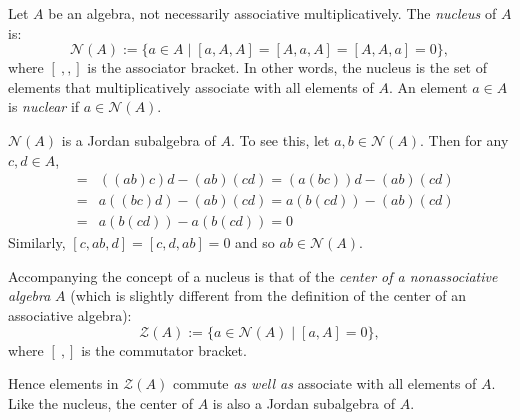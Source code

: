 \documentclass[12pt]{article}
\begin{document}

Let $A$ be an algebra, not necessarily associative multiplicatively.  The \emph{nucleus} of $A$ is:
$$\mathcal{N}(A):=\lbrace a\in A\mid [a,A,A]=[A,a,A]=[A,A,a]=0 \rbrace,$$
where $[\ , , ]$ is the associator bracket.  In other words, the nucleus is the set of elements that multiplicatively associate with all elements of $A$.  An element $a\in A$ is \emph{nuclear} if $a\in\mathcal{N}(A)$.

$\mathcal{N}(A)$ is a Jordan subalgebra of $A$.  To see this, let $a,b\in \mathcal{N}(A)$.  Then for any $c,d\in A$,  
\begin{eqnarray}
[ab,c,d] &=& ((ab)c)d-(ab)(cd) = (a(bc))d-(ab)(cd) \\
&=& a((bc)d)-(ab)(cd) = a(b(cd))-(ab)(cd) \\
&=& a(b(cd))-a(b(cd)) = 0
\end{eqnarray}
Similarly, $[c,ab,d]=[c,d,ab]=0$ and so $ab\in\mathcal{N}(A)$.

Accompanying the concept of a nucleus is that of the \emph{center of a nonassociative algebra} $A$ (which is slightly different from the definition of the center of an associative algebra):
$$\mathcal{Z}(A):=\lbrace a\in \mathcal{N}(A)\mid [a,A]=0 \rbrace,$$
where $[\ , ]$ is the commutator bracket.

Hence elements in $\mathcal{Z}(A)$ commute \emph{as well as} associate with all elements of $A$.  Like the nucleus, the center of $A$ is also a Jordan subalgebra of $A$.
\end{document}
